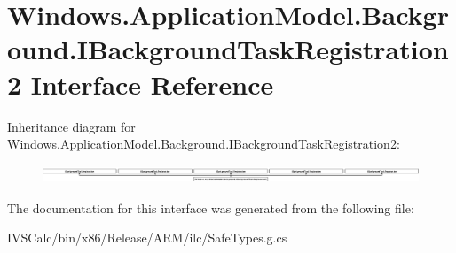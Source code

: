 \hypertarget{interface_windows_1_1_application_model_1_1_background_1_1_i_background_task_registration2}{}\section{Windows.\+Application\+Model.\+Background.\+I\+Background\+Task\+Registration2 Interface Reference}
\label{interface_windows_1_1_application_model_1_1_background_1_1_i_background_task_registration2}
Inheritance diagram for Windows.\+Application\+Model.\+Background.\+I\+Background\+Task\+Registration2\+:\begin{figure}[H]
\begin{center}
\leavevmode
\includegraphics[height=0.535885cm]{interface_windows_1_1_application_model_1_1_background_1_1_i_background_task_registration2}
\end{center}
\end{figure}


The documentation for this interface was generated from the following file\+:\begin{DoxyCompactItemize}
\item 
I\+V\+S\+Calc/bin/x86/\+Release/\+A\+R\+M/ilc/Safe\+Types.\+g.\+cs\end{DoxyCompactItemize}
